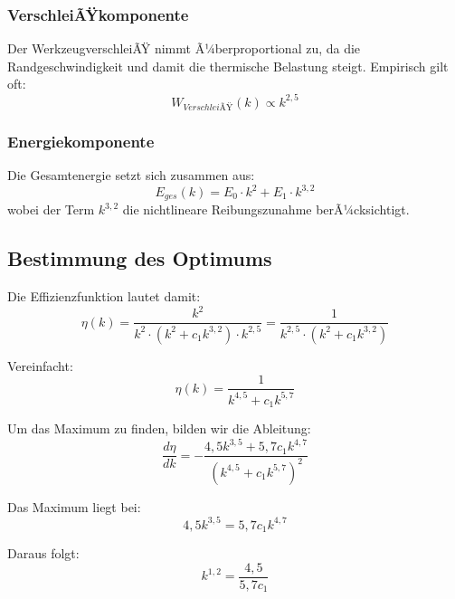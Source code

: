 ﻿\documentclass[12pt,a4paper]{article}
\begin{document}
\subsubsection{VerschleiÃŸkomponente}

Der WerkzeugverschleiÃŸ nimmt Ã¼berproportional zu, da die Randgeschwindigkeit und damit die thermische Belastung steigt. Empirisch gilt oft:
\begin{equation}
	W_{VerschleiÃŸ}(k) \propto k^{2{,}5}
\end{equation}

\subsubsection{Energiekomponente}

Die Gesamtenergie setzt sich zusammen aus:
\begin{equation}
	E_{ges}(k) = E_0 \cdot k^2 + E_1 \cdot k^{3{,}2}
\end{equation}
wobei der Term $k^{3{,}2}$ die nichtlineare Reibungszunahme berÃ¼cksichtigt.

\subsection{Bestimmung des Optimums}

Die Effizienzfunktion lautet damit:
\begin{equation}
	\eta(k) = \frac{k^2}{k^2 \cdot (k^2 + c_1 k^{3{,}2}) \cdot k^{2{,}5}} = \frac{1}{k^{2{,}5} \cdot (k^2 + c_1 k^{3{,}2})}
\end{equation}

Vereinfacht:
\begin{equation}
	\eta(k) = \frac{1}{k^{4{,}5} + c_1 k^{5{,}7}}
\end{equation}

Um das Maximum zu finden, bilden wir die Ableitung:
\begin{equation}
	\frac{d\eta}{dk} = -\frac{4{,}5 k^{3{,}5} + 5{,}7 c_1 k^{4{,}7}}{(k^{4{,}5} + c_1 k^{5{,}7})^2}
\end{equation}

Das Maximum liegt bei:
\begin{equation}
	4{,}5 k^{3{,}5} = 5{,}7 c_1 k^{4{,}7}
\end{equation}

Daraus folgt:
\begin{equation}
	k^{1{,}2} = \frac{4{,}5}{5{,}7 c_1}
\end{equation}
\end{document}
